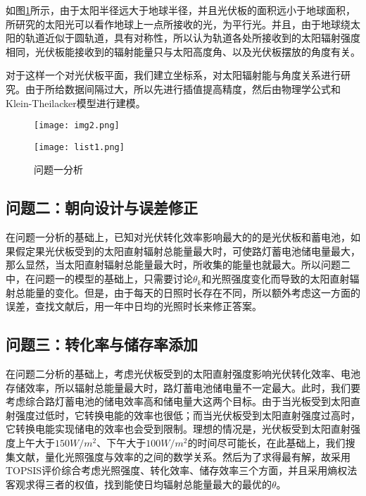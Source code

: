 \documentclass[withoutpreface,bwprint]{cumcmthesis} %
\begin{document}
如图\ref{fig:001}所示，由于太阳半径远大于地球半径，并且光伏板的面积远小于地球面积，所研究的太阳光可以看作地球上一点所接收的光，为平行光。并且，由于地球绕太阳的轨道近似于圆轨道，具有对称性，所以认为轨道各处所接收到的太阳辐射强度相同，光伏板能接收到的辐射能量只与太阳高度角、以及光伏板摆放的角度有关。

对于这样一个对光伏板平面，我们建立坐标系，对太阳辐射能与角度关系进行研究。由于所给数据间隔过大，所以先进行插值提高精度，然后由物理学公式和Klein-Theilacker模型进行建模。
\begin{figure}
	\centering
	\begin{minipage}[c]{0.48\textwidth}
		\centering
		\texttt{[image: img2.png]}
		\label{fig:001}
	\end{minipage}
	\begin{minipage}[c]{0.48\textwidth}
		\centering
		\texttt{[image: list1.png]}
	\end{minipage}
	\caption{问题一分析}
\end{figure}


\subsection{问题二：朝向设计与误差修正}

在问题一分析的基础上，已知对光伏转化效率影响最大的的是光伏板和蓄电池，如果假定果光伏板受到的太阳直射辐射总能量最大时，可使路灯蓄电池储电量最大，那么显然，当太阳直射辐射总能量最大时，所收集的能量也就最大。所以问题二中，在问题一的模型的基础上，只需要讨论$\theta_{k}$和光照强度变化而导致的太阳直射辐射总能量的变化。但是，由于每天的日照时长存在不同，所以额外考虑这一方面的误差，查找文献后，用一年中日均的光照时长来修正答案。

\subsection{问题三：转化率与储存率添加}

在问题二分析的基础上，考虑光伏板受到的太阳直射强度影响光伏转化效率、电池存储效率，所以辐射总能量最大时，路灯蓄电池储电量不一定最大。此时，我们要考虑综合路灯蓄电池的储电效率高和储电量大这两个目标。由于当光板受到太阳直射强度过低时，它转换电能的效率也很低；而当光伏板受到太阳直射强度过高时，它转换电能实现储电的效率也会受到限制。理想的情况是，光伏板受到太阳直射强度上午大于$150W/m^{2}$、下午大于$100W/m^{2}$的时间尽可能长，在此基础上，我们搜集文献，量化光照强度与效率的之间的数学关系。然后为了求得最有解，故采用TOPSIS评价综合考虑光照强度、转化效率、储存效率三个方面，并且采用熵权法客观求得三者的权值，找到能使日均辐射总能量最大的最优的$\theta$。
\end{document}
